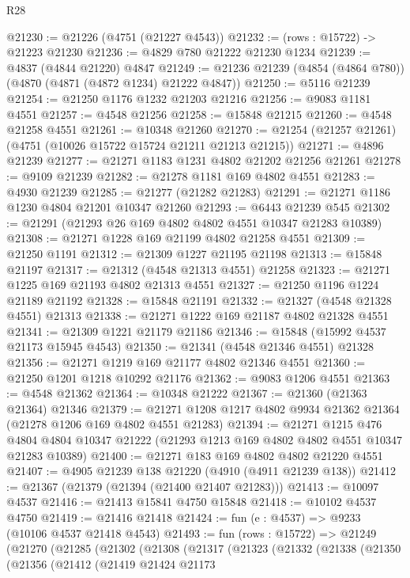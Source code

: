\begin{lexlean}{R28}
\begin{coremodule}
@21230 := @21226 (@4751 (@21227 @4543))
@21232 := (rows : @15722) -> @21223 @21230
@21236 := @4829 @780 @21222 @21230 @1234
@21239 := @4837 (@4844 @21220) @4847
@21249 := @21236 @21239 (@4854 (@4864 @780)) (@4870 (@4871 (@4872 @1234) @21222 @4847))
@21250 := @5116 @21239
@21254 := @21250 @1176 @1232 @21203 @21216
@21256 := @9083 @1181 @4551
@21257 := @4548 @21256
@21258 := @15848 @21215
@21260 := @4548 @21258 @4551
@21261 := @10348 @21260
@21270 := @21254 (@21257 @21261) (@4751 (@10026 @15722 @15724 @21211 @21213 @21215))
@21271 := @4896 @21239
@21277 := @21271 @1183 @1231 @4802 @21202 @21256 @21261
@21278 := @9109 @21239
@21282 := @21278 @1181 @169 @4802 @4551
@21283 := @4930 @21239
@21285 := @21277 (@21282 @21283)
@21291 := @21271 @1186 @1230 @4804 @21201 @10347 @21260
@21293 := @6443 @21239 @545
@21302 := @21291 (@21293 @26 @169 @4802 @4802 @4551 @10347 @21283 @10389)
@21308 := @21271 @1228 @169 @21199 @4802 @21258 @4551
@21309 := @21250 @1191
@21312 := @21309 @1227 @21195 @21198
@21313 := @15848 @21197
@21317 := @21312 (@4548 @21313 @4551) @21258
@21323 := @21271 @1225 @169 @21193 @4802 @21313 @4551
@21327 := @21250 @1196 @1224 @21189 @21192
@21328 := @15848 @21191
@21332 := @21327 (@4548 @21328 @4551) @21313
@21338 := @21271 @1222 @169 @21187 @4802 @21328 @4551
@21341 := @21309 @1221 @21179 @21186
@21346 := @15848 (@15992 @4537 @21173 @15945 @4543)
@21350 := @21341 (@4548 @21346 @4551) @21328
@21356 := @21271 @1219 @169 @21177 @4802 @21346 @4551
@21360 := @21250 @1201 @1218 @10292 @21176
@21362 := @9083 @1206 @4551
@21363 := @4548 @21362
@21364 := @10348 @21222
@21367 := @21360 (@21363 @21364) @21346
@21379 := @21271 @1208 @1217 @4802 @9934 @21362 @21364 (@21278 @1206 @169 @4802 @4551 @21283)
@21394 := @21271
    @1215
    @476
    @4804
    @4804
    @10347
    @21222
    (@21293 @1213 @169 @4802 @4802 @4551 @10347 @21283 @10389)
@21400 := @21271 @183 @169 @4802 @4802 @21220 @4551
@21407 := @4905 @21239 @138 @21220 (@4910 (@4911 @21239 @138))
@21412 := @21367 (@21379 (@21394 (@21400 @21407 @21283)))
@21413 := @10097 @4537
@21416 := @21413 @15841 @4750 @15848
@21418 := @10102 @4537 @4750
@21419 := @21416 @21418
@21424 := fun (e : @4537) => @9233 (@10106 @4537 @21418 @4543)
@21493 := fun (rows : @15722) =>
  @21249
    (@21270
      (@21285
        (@21302
          (@21308
            (@21317
              (@21323
                (@21332
                  (@21338
                    (@21350
                      (@21356
                        (@21412
                          (@21419
                            @21424
                            @21173

\end{coremodule}
\end{lexlean}
